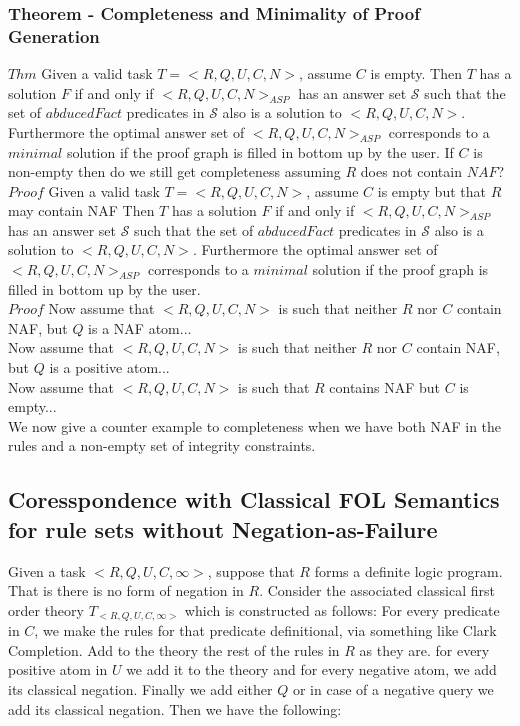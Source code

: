 \documentclass{article}
\begin{document}
\subsubsection{Theorem - Completeness and Minimality of Proof Generation}
$Thm$ Given a valid task $T= <R,Q,U,C,N>$, assume $C$ is empty. Then $T$ has a solution $F$ if and only if $<R,Q,U,C,N>_{ASP}$ has an answer set $\mathcal{S}$ such that the set of $abducedFact$ predicates in $\mathcal{S}$ also is a solution to $<R,Q,U,C,N>$. Furthermore the optimal answer set of $<R,Q,U,C,N>_{ASP}$ corresponds to a $minimal$ solution if the proof graph is filled in bottom up by the user. If $C$ is non-empty then do we still get completeness assuming $R$ does not contain $NAF$?\\
\newline
$Proof$
Given a valid task $T= <R,Q,U,C,N>$, assume $C$ is empty but that $R$ may contain NAF Then $T$ has a solution $F$ if and only if $<R,Q,U,C,N>_{ASP}$ has an answer set $\mathcal{S}$ such that the set of $abducedFact$ predicates in $\mathcal{S}$ also is a solution to $<R,Q,U,C,N>$. Furthermore the optimal answer set of $<R,Q,U,C,N>_{ASP}$ corresponds to a $minimal$ solution if the proof graph is filled in bottom up by the user.\\

$Proof$ Now assume that $<R,Q,U,C,N>$ is such that neither $R$ nor $C$ contain NAF, but $Q$ is a NAF atom...\\
\newline
Now assume that $<R,Q,U,C,N>$ is such that neither $R$ nor $C$ contain NAF, but $Q$ is a positive atom...\\
\newline
Now assume that $<R,Q,U,C,N>$ is such that $R$ contains NAF but $C$ is empty...\\
\newline
We now give a counter example to completeness when we have both NAF in the rules and a non-empty set of integrity constraints.\\
\subsection{Coresspondence with Classical FOL Semantics for rule sets without Negation-as-Failure}
Given a task $<R,Q,U,C,\infty>$, suppose that $R$ forms a definite logic program. That is there is no form of negation in $R$. Consider the associated classical first order theory $T_{<R,Q,U,C,\infty>}$ which is constructed as follows: For every predicate in $C$, we make the rules for that predicate definitional, via something like Clark Completion. Add to the theory the rest of the rules in $R$ as they are. for every positive atom in $U$ we add it to the theory and for every negative atom, we add its classical negation. Finally we add either $Q$ or in case of a negative query we add its classical negation. Then we have the following:
\end{document}
